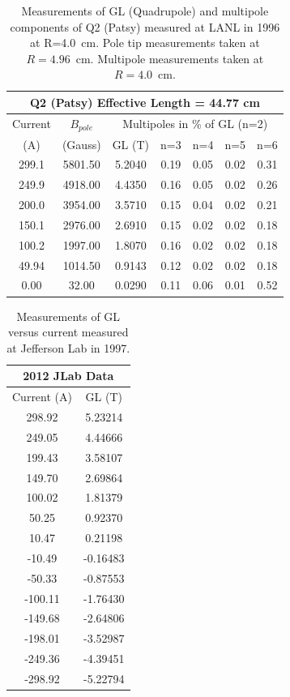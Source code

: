 \documentclass[12pt]{article}
\begin{document}
\begin{table}[!h]
\begin{center}
\caption{\label{tab:PatsyMultipole}Measurements of GL (Quadrupole) and multipole components of Q2 (Patsy) measured at LANL in 1996 at R=4.0~cm. Pole tip measurements taken at $R=4.96$~cm. Multipole measurements taken at $R=4.0$~cm.}
\begin{tabular}{|c|c|c|c|c|c|c|}
\hline
\multicolumn{7}{|c|}{Q2 (Patsy) Effective Length = 44.77 cm}	\\ \hline					
Current&	$B_{pole}$&\multicolumn{5}{|c|}{Multipoles in \% of GL (n=2) }\\ 			
(A)     	&(Gauss)	&GL (T)    &n=3        &n=4        &n=5         &n=6\\\hline
299.1	&5801.50&	5.2040&	0.19	&0.05	&0.02	&0.31\\
249.9	&4918.00&	4.4350&	0.16	&0.05	&0.02	&0.26\\
200.0	&3954.00&	3.5710&	0.15	&0.04	&0.02	&0.21\\
150.1	&2976.00&	2.6910&	0.15	&0.02	&0.02	&0.18\\
100.2	&1997.00&	1.8070&	0.16	&0.02	&0.02	&0.18\\
49.94	&1014.50&	0.9143&	0.12	&0.02	&0.02	&0.18\\
0.00 		&32.00    & 	0.0290&	0.11  &0.06	&0.01	&0.52\\\hline
\end{tabular}
\end{center}
\end{table}

\begin{table}[!ht]
\begin{center}
\caption{\label{tab:PatsyGLvsCurJLab}Measurements of GL versus current measured at Jefferson Lab in 1997.}

\begin{tabular}{|c|c|}
\hline		
\multicolumn{2}{|c|}{2012 JLab Data}\\\hline		
Current (A)&GL  (T) \\\hline	
298.92 	& 5.23214\\
249.05 	& 4.44666\\
199.43 	& 3.58107\\
149.70 	& 2.69864\\
100.02 	& 1.81379\\
50.25 	& 0.92370\\
10.47 	& 0.21198\\
-10.49 	&-0.16483\\
-50.33 	&-0.87553\\
-100.11 	&-1.76430\\
-149.68 	&-2.64806\\
-198.01 	&-3.52987\\
-249.36 	&-4.39451\\
-298.92 	&-5.22794\\\hline
\end{tabular}
\end{center}
\end{table}
\end{document}
